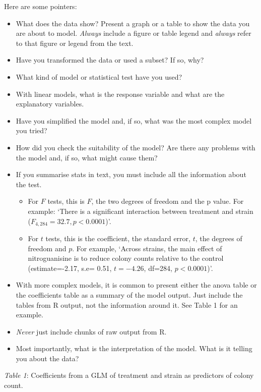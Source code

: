 Here are some pointers:
\begin{itemize}
	\item What does the data show? Present a graph or a table to show the 
	data you are about to model. {\it Always} include a figure or table 
	legend and {\it always} refer to that figure or legend from the text.
	\item Have you transformed the data or used a subset? If so, why?
	\item What kind of model or statistical test have you used?
	\item With linear models, what is the response variable and what are 
	the explanatory variables.
	\item Have you simplified the model and, if so, what was the most 
	complex model you tried?
	\item How did you check the suitability of the model? Are there any 
	problems with the model and, if so, what might cause them?
	\item If you summarise stats in text, you must include all the 
	information about the test. 
	\begin{itemize}
		\item For $F$ tests, this is $F$, the two degrees of freedom and 
		the p value. For example: `There is a significant interaction 
		between treatment and strain ($F_{4,284}=32.7, p < 0.0001$)'. 
		\item For $t$ tests, this is the coefficient, the standard error, 
		$t$, the degrees of freedom and $p$. For example, `Across strains, 
		the main effect of nitroguanisine is to reduce colony counts 
		relative to the control (estimate=-2.17, s.e= 0.51, $t=-4.26$, 
		df=284,  $p < 0.0001$)'.
	\end{itemize}
	\item With more complex models, it is common to present either the 
	anova table or the coefficients table as a summary of the model 
	output. Just include the tables from R output, not the information 
	around it. See Table 1 for an example. 
	\item {\it Never} just include chunks of raw output from R.
	\item Most importantly, what is the interpretation of the model. What 
	is it telling you about the data?
\end{itemize}

{\it Table 1}: Coefficients from a GLM of treatment and strain as 
predictors of colony count.

